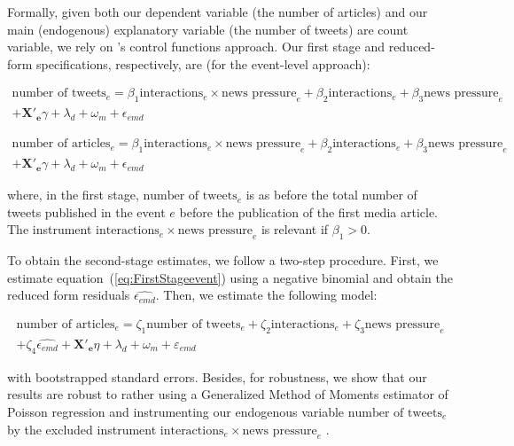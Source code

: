 Formally, given both our dependent variable (the number of articles) and our main (endogenous) explanatory variable (the number of tweets) are count variable, we rely on \citet{Woodbrige2002,Wooldridge2013}'s control functions approach. Our first stage and reduced-form specifications, respectively, are (for the event-level approach):
 
\begin{multline}
\text{number of tweets}_{e}= \beta_{1} \text{interactions}_{e} \times \text{news pressure}_{e}  + \beta_{2} \text{interactions}_{e} + \beta_{3} \text{news pressure}_{e} \\ 
+ \mathbf{X'_{e}}\gamma + \lambda_d + \omega_m + \epsilon_{emd}
\label{eq:FirstStageevent}
\end{multline} 

\begin{multline}
\text{number of articles}_{e}= \beta_{1} \text{interactions}_{e} \times \text{news pressure}_{e}  + \beta_{2} \text{interactions}_{e} + \beta_{3} \text{news pressure}_{e} \\ 
+ \mathbf{X'_{e}}\gamma + \lambda_d + \omega_m + \epsilon_{emd}
\label{eq:RFevent}
\end{multline} 

\noindent where, in the first stage, $\text{number of tweets}_{e}$ is as before the total number of tweets published in the event $e$ before the publication of the first media article. The instrument $\text{interactions}_{e} \times \text{news pressure}_{e}$ is relevant if $\beta_{1}>0$.

To obtain the second-stage estimates, we follow a two-step procedure. First, we estimate equation~(\ref{eq:FirstStageevent}) using a negative binomial and obtain the reduced form residuals $\widehat{\epsilon_{emd}}$. Then, we estimate the following model:

\begin{multline}
\text{number of articles}_{e}= \zeta_{1} \text{number of tweets}_{e} + \zeta_{2} \text{interactions}_{e} + \zeta_{3} \text{news pressure}_{e} \\ 
+ \zeta_{4} \widehat{\epsilon_{emd}} + \mathbf{X'_{e}}\eta + \lambda_d + \omega_m + \varepsilon_{emd}
\label{eq:SecondStageevent}
\end{multline} 

\noindent with bootstrapped standard errors. Besides, for robustness, we show that our results are robust to rather using a Generalized Method of Moments estimator of Poisson regression and instrumenting our endogenous variable $\text{number of tweets}_{e}$ by the excluded instrument $\text{interactions}_{e} \times \text{news pressure}_{e}$ \citep{Nichols2007}.



